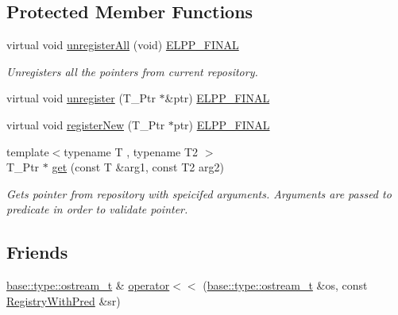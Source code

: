 \subsection*{Protected Member Functions}
\begin{DoxyCompactItemize}
\item 
virtual void \hyperlink{classel_1_1base_1_1utils_1_1_registry_with_pred_a66b4eca5bb71f3fa3f0737105a00890c}{unregister\+All} (void) \hyperlink{easylogging_09_09_8h_a2f812449f8d3355cf5b03ceb2ee5021b}{E\+L\+P\+P\+\_\+\+F\+I\+N\+A\+L}
\begin{DoxyCompactList}\small\item\em Unregisters all the pointers from current repository. \end{DoxyCompactList}\item 
virtual void \hyperlink{classel_1_1base_1_1utils_1_1_registry_with_pred_aaf1afb5a9f8bd1d99c46ac529ea16417}{unregister} (T\+\_\+\+Ptr $\ast$\&ptr) \hyperlink{easylogging_09_09_8h_a2f812449f8d3355cf5b03ceb2ee5021b}{E\+L\+P\+P\+\_\+\+F\+I\+N\+A\+L}
\item 
virtual void \hyperlink{classel_1_1base_1_1utils_1_1_registry_with_pred_a561a5d418106a16473ff94d43a4b6b04}{register\+New} (T\+\_\+\+Ptr $\ast$ptr) \hyperlink{easylogging_09_09_8h_a2f812449f8d3355cf5b03ceb2ee5021b}{E\+L\+P\+P\+\_\+\+F\+I\+N\+A\+L}
\item 
{\footnotesize template$<$typename T , typename T2 $>$ }\\T\+\_\+\+Ptr $\ast$ \hyperlink{classel_1_1base_1_1utils_1_1_registry_with_pred_a811d9cc011d945bc7237e6ae1cf2f096}{get} (const T \&arg1, const T2 arg2)
\begin{DoxyCompactList}\small\item\em Gets pointer from repository with speicifed arguments. Arguments are passed to predicate in order to validate pointer. \end{DoxyCompactList}\end{DoxyCompactItemize}
\subsection*{Friends}
\begin{DoxyCompactItemize}
\item 
\hyperlink{namespaceel_1_1base_1_1type_a74ea109bf34d1c44926837fb0830f445}{base\+::type\+::ostream\+\_\+t} \& \hyperlink{classel_1_1base_1_1utils_1_1_registry_with_pred_a71b45d148b62604847fe06f7addda779}{operator$<$$<$} (\hyperlink{namespaceel_1_1base_1_1type_a74ea109bf34d1c44926837fb0830f445}{base\+::type\+::ostream\+\_\+t} \&os, const \hyperlink{classel_1_1base_1_1utils_1_1_registry_with_pred}{Registry\+With\+Pred} \&sr)
\end{DoxyCompactItemize}


